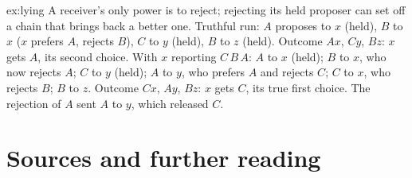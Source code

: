 \begin{solution}{ex:lying}
\idea A receiver's only power is to reject; rejecting its held proposer can set off a chain that brings back a better one.
\writeup Truthful run: $A$ proposes to $x$ (held), $B$ to $x$ ($x$ prefers $A$, rejects $B$), $C$ to $y$ (held), $B$ to $z$ (held). Outcome $Ax$, $Cy$, $Bz$: $x$ gets $A$, its second choice.
With $x$ reporting $C\,B\,A$: $A$ to $x$ (held); $B$ to $x$, who now rejects $A$; $C$ to $y$ (held); $A$ to $y$, who prefers $A$ and rejects $C$; $C$ to $x$, who rejects $B$; $B$ to $z$.
Outcome $Cx$, $Ay$, $Bz$: $x$ gets $C$, its true first choice. The rejection of $A$ sent $A$ to $y$, which released $C$.
\end{solution}

\section*{Sources and further reading}

